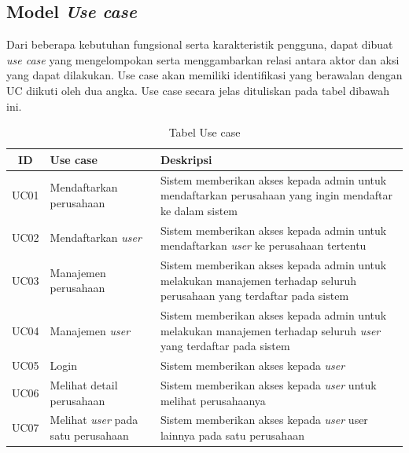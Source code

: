 \subsection{Model \textit{Use case}}
\label{subsec:model-usecase}
Dari beberapa kebutuhan fungsional serta karakteristik pengguna, dapat dibuat \textit{use case} yang mengelompokan serta menggambarkan relasi antara aktor dan aksi yang dapat dilakukan. Use case akan memiliki identifikasi yang berawalan dengan UC diikuti oleh dua angka. Use case secara jelas dituliskan pada tabel dibawah ini.

\begin{table}[ht]
  \caption{Tabel Use case}
  \label{tab:penjelasan-usecase-diagram}
  \centering
  \begin{tabular}{|c|p{4cm}|p{8cm}|}
    \hline
    ID   & Use case                                   & Deskripsi                                                                                                                                  \\
    \hline
    UC01 & Mendaftarkan perusahaan                    & Sistem memberikan akses kepada admin untuk mendaftarkan perusahaan yang ingin mendaftar ke dalam sistem                                    \\
    \hline
    UC02 & Mendaftarkan \textit{user}                 & Sistem memberikan akses kepada admin untuk mendaftarkan \textit{user} ke perusahaan tertentu                                               \\
    \hline
    UC03 & Manajemen perusahaan                       & Sistem memberikan akses kepada admin untuk melakukan manajemen terhadap seluruh perusahaan yang terdaftar pada sistem                      \\
    \hline
    UC04 & Manajemen \textit{user}                    & Sistem memberikan akses kepada admin untuk melakukan manajemen terhadap seluruh \textit{user} yang terdaftar pada sistem                   \\
    \hline
    UC05 & Login                                      & Sistem memberikan akses kepada \textit{user}                                                                                               \\
    \hline
    UC06 & Melihat detail perusahaan                  & Sistem memberikan akses kepada \textit{user} untuk melihat perusahaanya                                                                    \\
    \hline
    UC07 & Melihat \textit{user} pada satu perusahaan & Sistem memberikan akses kepada \textit{user} user lainnya pada satu perusahaan                                                             \\


\end{tabular}
\end{table}
